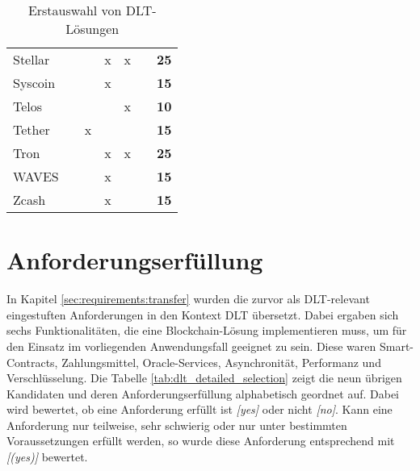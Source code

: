 \begin{table}[]
\begin{tabular}{@{}lcccccc@{}}
Stellar &  &  & x & x &  & \textbf{25} \\
Syscoin &  &  & x &  &  & \textbf{15} \\
Telos &  &  &  & x &  & \textbf{10} \\
Tether &  & x &  &  &  & \textbf{15} \\
Tron &  &  & x & x &  & \textbf{25} \\
WAVES &  &  & x &  &  & \textbf{15} \\
Zcash &  &  & x &  &  & \textbf{15} \\ \bottomrule
\end{tabular}
\caption{Erstauswahl von DLT-Lösungen}
\label{tab:dlt_preselection}
\end{table}

%
%
\section{Anforderungserfüllung}
\label{sec:dlt_selection:fullfilment}
In Kapitel \ref{sec:requirements:transfer} wurden die zurvor als \ac{DLT}-relevant eingestuften Anforderungen in den Kontext \ac{DLT} übersetzt. Dabei ergaben sich sechs Funktionalitäten, die eine Blockchain-Lösung implementieren muss, um für den Einsatz im vorliegenden Anwendungsfall geeignet zu sein. Diese waren Smart-Contracts, Zahlungsmittel, Oracle-Services, Asynchronität, Performanz und Verschlüsselung. Die Tabelle \ref{tab:dlt_detailed_selection} zeigt die neun übrigen Kandidaten und deren Anforderungserfüllung alphabetisch geordnet auf. Dabei wird bewertet, ob eine Anforderung erfüllt ist \textit{[yes]} oder nicht \textit{[no]}. Kann eine Anforderung nur teilweise, sehr schwierig oder nur unter bestimmten Voraussetzungen erfüllt werden, so wurde diese Anforderung entsprechend mit \textit{[(yes)]} bewertet.


